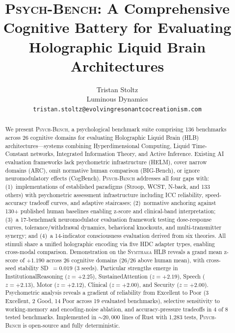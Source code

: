 \documentclass[11pt,letterpaper]{article}
\newcommand{\symthaea}{\textsc{Symthaea}}
\newcommand{\psychbench}{\textsc{Psych-Bench}}
\newcommand{\hlb}{\textsc{HLB}}
\begin{document}
\title{\psychbench{}: A Comprehensive Cognitive Battery for Evaluating\\
Holographic Liquid Brain Architectures}

\author{Tristan Stoltz\\
Luminous Dynamics\\
\texttt{tristan.stoltz@evolvingresonantcocreationism.com}}

\date{}
\maketitle

\begin{abstract}
\noindent
We present \psychbench{}, a psychological benchmark suite comprising 136 benchmarks across 26 cognitive domains for evaluating Holographic Liquid Brain (\hlb{}) architectures---systems combining Hyperdimensional Computing, Liquid Time-Constant networks, Integrated Information Theory, and Active Inference. Existing AI evaluation frameworks lack psychometric infrastructure (HELM), cover narrow domains (ARC), omit normative human comparison (BIG-Bench), or ignore neuromodulatory effects (CogBench). \psychbench{} addresses all four gaps with: (1)~implementations of established paradigms (Stroop, WCST, N-back, and 133 others) with psychometric assessment infrastructure including ICC reliability, speed-accuracy tradeoff curves, and adaptive staircases; (2)~normative anchoring against 130+ published human baselines enabling z-score and clinical-band interpretation; (3)~a 17-benchmark neuromodulator evaluation framework testing dose-response curves, tolerance/withdrawal dynamics, behavioral knockouts, and multi-transmitter synergy; and (4)~a 14-indicator consciousness evaluation derived from six theories. All stimuli share a unified holographic encoding via five HDC adapter types, enabling cross-modal comparison. Demonstration on the \symthaea{} \hlb{} reveals a grand mean z-score of $+1.190$ across 26 cognitive domains (26/26 above human mean), with cross-seed stability SD~$= 0.019$ (3 seeds). Particular strengths emerge in InstitutionalReasoning ($z = +2.25$), SustainedAttention ($z = +2.19$), Speech ($z = +2.13$), Motor ($z = +2.12$), Clinical ($z = +2.00$), and Security ($z = +2.00$). Psychometric analysis reveals a gradient of reliability from Excellent to Poor (3 Excellent, 2 Good, 14 Poor across 19 evaluated benchmarks), selective sensitivity to working-memory and encoding-noise ablation, and accuracy-pressure tradeoffs in 4 of 8 tested benchmarks. Implemented in ${\sim}20{,}000$ lines of Rust with 1,283 tests, \psychbench{} is open-source and fully deterministic.
\end{abstract}
\end{document}
